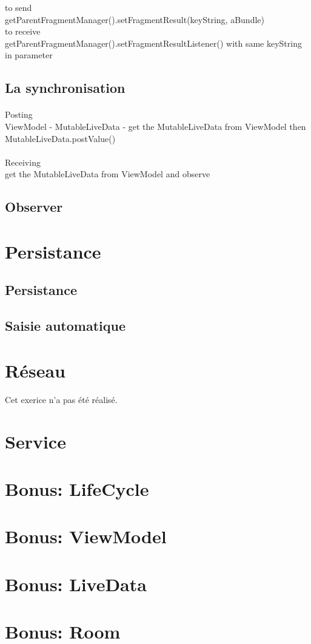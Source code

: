 \documentclass[a4paper]{article}
\begin{document}
\begin{multicols}{2}
                    to send
                \\
                getParentFragmentManager().setFragmentResult(keyString, aBundle)
                \\
                to receive
                \\
                getParentFragmentManager().setFragmentResultListener() with same keyString in parameter 
            \subsection{La synchronisation}
                \paragraph{}
                    Posting
                    \\
                    ViewModel - MutableLiveData - get the MutableLiveData from ViewModel then MutableLiveData.postValue()
                \paragraph{}
                    Receiving
                    \\
                    get the MutableLiveData from ViewModel and observe
            \subsection{Observer}
        \section{Persistance}
            \subsection{Persistance}
            \subsection{Saisie automatique}
        \section{Réseau}
            Cet exerice n'a pas été réalisé.
        \section{Service}
        \section{Bonus: LifeCycle}
        \section{Bonus: ViewModel}
        \section{Bonus: LiveData}
        \section{Bonus: Room}
    \end{multicols}
\end{document}
